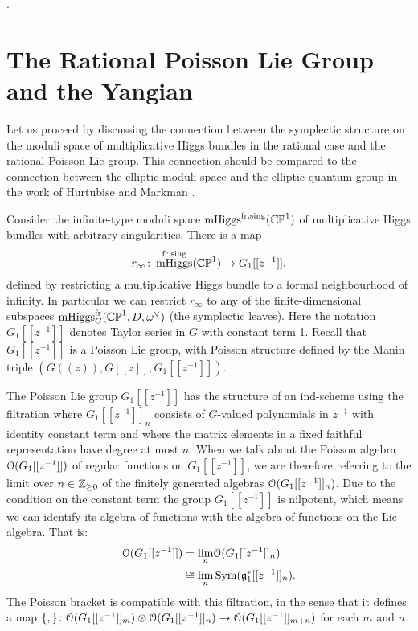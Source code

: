 \documentclass[10pt, oneside]{article}
\DeclareMathOperator{\mhiggs}{mHiggs}
\newcommand{\fr}{\mathrm{fr}}
\begin{document}
\begin{remark}
.
\end{remark}

\section{The Rational Poisson Lie Group and the Yangian} \label{quantization_section}
Let us proceed by discussing the connection between the symplectic structure on the moduli space of multiplicative Higgs bundles in the rational case and the rational Poisson Lie group.  This connection should be compared to the connection between the elliptic moduli space and the elliptic quantum group in the work of Hurtubise and Markman \cite[Theorem 9.1]{HurtubiseMarkman}.  

Consider the infinite-type moduli space $\mhiggs^{\text{fr,sing}}(\bb{CP}^1)$ of multiplicative Higgs bundles with arbitrary singularities.  There is a map
\[r_\infty \colon \mhiggs^{\text{fr,sing}}(\bb{CP}^1) \to G_1[[z^{-1}]],\]
defined by restricting a multiplicative Higgs bundle to a formal neighbourhood of infinity.  In particular we can restrict $r_\infty$ to any of the finite-dimensional subspaces $\mhiggs^\fr_G(\bb{CP}^1,D,\omega^\vee)$ (the symplectic leaves).  Here the notation $G_1[[z^{-1}]]$ denotes Taylor series in $G$ with constant term 1.  Recall that $G_1[[z^{-1}]]$ is a Poisson Lie group, with Poisson structure defined by the Manin triple $(G(\!(z)\!), G[[z]], G_1[[z^{-1}]])$.

The Poisson Lie group $G_1[[z^{-1}]]$ has the structure of an ind-scheme using the filtration where $G_1[[z^{-1}]]_n$ consists of $G$-valued polynomials in $z^{-1}$ with identity constant term and where the matrix elements in a fixed faithful representation have degree at most $n$.  When we talk about the Poisson algebra $\mathcal{O}(G_1[[z^{-1}]])$ of regular functions on $G_1[[z^{-1}]]$, we are therefore referring to the limit over $n \in \mathbb{Z}_{\ge 0}$ of the finitely generated algebras $\mathcal{O}(G_1[[z^{-1}]]_n)$.  Due to the condition on the constant term the group $G_1[[z^{-1}]]$ is nilpotent, which means we can identify its algebra of functions with the algebra of functions on the Lie algebra.  That is:
\begin{align*}
\mathcal{O}(G_1[[z^{-1}]]) &= \underset n \lim \mathcal{O}(G_1[[z^{-1}]]_n) \\
&\cong \underset n \lim \operatorname{Sym}(\mathfrak{g}_1^*[[z^{-1}]]_n).
\end{align*}
The Poisson bracket is compatible with this filtration, in the sense that it defines a map $\{,\} \colon \mathcal{O}(G_1[[z^{-1}]]_m) \otimes \mathcal{O}(G_1[[z^{-1}]]_n) \to \mathcal{O}(G_1[[z^{-1}]]_{m+n})$ for each $m$ and $n$.
\end{document}

